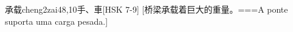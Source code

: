 \begin{EntryWithPhonetic}{承载}{cheng2zai4}{8,10}{⼿、⾞}[HSK 7-9]
  [桥梁承载着巨大的重量。===A ponte suporta uma carga pesada.]
\end{EntryWithPhonetic}
